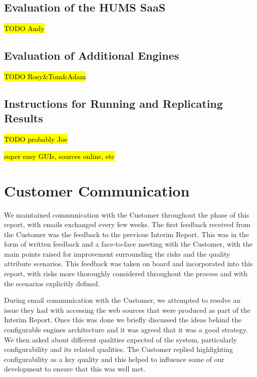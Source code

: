 \documentclass[10pt,a4paper]{article}
\begin{document}
\subsection{Evaluation of the HUMS SaaS}
\label{sec:hums_saas}
\hl{TODO Andy}


\subsection{Evaluation of Additional Engines}
\label{sec:additional}
\hl{TODO Rosy\&Tom\&Adam}


\subsection{Instructions for Running and Replicating Results}
\label{sec:instructions}

\hl{TODO probably Joe}

\hl{super easy GUIs, sources online, etc}


\section{Customer Communication}
\label{sec:customer_comms}

We maintained communication with the Customer throughout the phase of this report, with emails exchanged every few weeks. The first feedback received from the Customer was the feedback to the previous Interim Report. This was in the form of written feedback and a face-to-face meeting with the Customer, with the main points raised for improvement surrounding the risks and the quality attribute scenarios. This feedback was taken on board and incorporated into this report, with risks more thoroughly considered throughout the process and with the scenarios explicitly defined.

During email communication with the Customer, we attempted to resolve an issue they had with accessing the web sources that were produced as part of the Interim Report. Once this was done we briefly discussed the ideas behind the configurable engines architecture and it was agreed that it was a good strategy. We then asked about different qualities expected of the system, particularly configurability and its related qualities. The Customer replied highlighting configurability as a key quality and this helped to influence some of our development to ensure that this was well met.
\end{document}
